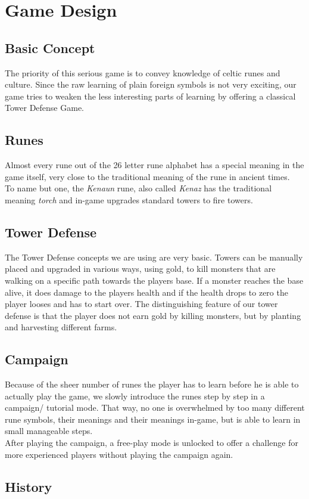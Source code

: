\chapter{Game Design}

\section{Basic Concept}
The priority of this serious game is to convey knowledge of celtic runes and culture. 
Since the raw learning of plain foreign symbols is not very exciting, our game tries to weaken the less interesting parts of learning by offering a classical Tower Defense Game.

\section{Runes}

Almost every rune out of the 26 letter rune alphabet has a special meaning in the game itself, very close to the traditional meaning of the rune in ancient times.\\
To name but one, the \emph{Kenaun} rune, also called \emph{Kenaz} has the traditional meaning \emph{torch} and in-game upgrades standard towers to fire towers.

\section{Tower Defense}

The Tower Defense concepts we are using are very basic. Towers can be manually placed and upgraded in various ways, using gold, to kill monsters that are walking on a specific path towards the players base. If a monster reaches the base alive, it does damage to the players health and if the health drops to zero the player looses and has to start over. 
The distinguishing feature of our tower defense is that the player does not earn gold by killing monsters, but by planting and harvesting different farms.

\section{Campaign}

Because of the sheer number of runes the player has to learn before he is able to actually play the game, we slowly introduce the runes step by step in a campaign/ tutorial mode. That way, no one is overwhelmed by too many different rune symbols, their meanings and their meanings in-game, but is able to learn in small manageable steps. \\
After playing the campaign, a free-play mode is unlocked to offer a challenge for more experienced players without playing the campaign again. \\

\section{History}